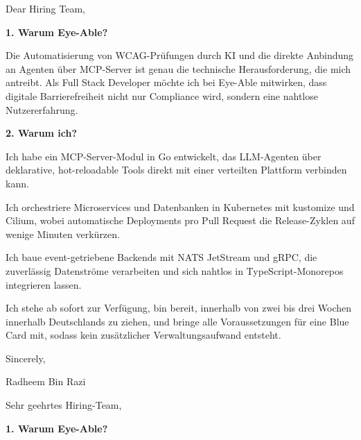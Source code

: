 \documentclass[11pt,a4paper]{coverletter}
\begin{document}

\opening{Dear Hiring Team,}

\vspace{8pt}\noindent\textbf{1. Warum Eye-Able?}\par\vspace{3pt}

Die Automatisierung von WCAG-Prüfungen durch KI und die direkte Anbindung an Agenten über MCP-Server ist genau die technische Herausforderung, die mich antreibt. Als Full Stack Developer möchte ich bei Eye-Able mitwirken, dass digitale Barrierefreiheit nicht nur Compliance wird, sondern eine nahtlose Nutzererfahrung.

\vspace{8pt}\noindent\textbf{2. Warum ich?}\par\vspace{3pt}

\bullets

  \item Ich habe ein MCP-Server-Modul in Go entwickelt, das LLM-Agenten über deklarative, hot-reloadable Tools direkt mit einer verteilten Plattform verbinden kann.

  \item Ich orchestriere Microservices und Datenbanken in Kubernetes mit kustomize und Cilium, wobei automatische Deployments pro Pull Request die Release-Zyklen auf wenige Minuten verkürzen.

  \item Ich baue event-getriebene Backends mit NATS JetStream und gRPC, die zuverlässig Datenströme verarbeiten und sich nahtlos in TypeScript-Monorepos integrieren lassen.

\bulletsend

Ich stehe ab sofort zur Verfügung, bin bereit, innerhalb von zwei bis drei Wochen innerhalb Deutschlands zu ziehen, und bringe alle Voraussetzungen für eine Blue Card mit, sodass kein zusätzlicher Verwaltungsaufwand entsteht.

\closing{Sincerely,}{Radheem Bin Razi}

\clearpage
{}


\opening{Sehr geehrtes Hiring-Team,}

\vspace{8pt}\noindent\textbf{1. Warum Eye-Able?}\par\vspace{3pt}
\end{document}
